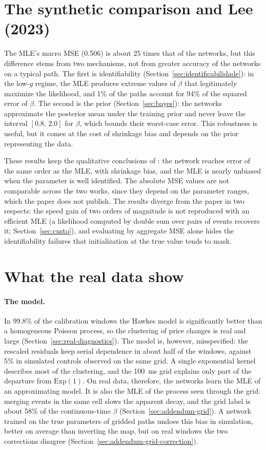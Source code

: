 \section{The synthetic comparison and Lee (2023)}

The MLE's macro MSE (0.506) is about 25 times that of the networks, but this
difference stems from two mechanisms, not from greater accuracy of the networks on a
typical path. The first is identifiability (Section~\ref{sec:identificabilidade}): in
the low-\(g\) regime, the MLE produces extreme values of \(\beta\) that legitimately
maximize the likelihood, and 1\% of the paths account for 94\% of the squared error
of \(\beta\). The second is the prior (Section~\ref{sec:bayes}): the networks
approximate the posterior mean under the training prior and never leave the interval
\([0.8,\,2.0]\) for \(\beta\), which bounds their worst-case error. This robustness is
useful, but it comes at the cost of shrinkage bias and depends on the prior
representing the data.

These results keep the qualitative conclusions of \citet{lee2023}: the network reaches error of the same order as
the MLE, with shrinkage bias, and the MLE is nearly unbiased when the parameter is
well identified. The absolute MSE values are not comparable across the two works,
since they depend on the parameter ranges, which the paper does not publish. The
results diverge from the paper in two respects: the speed gain of two orders of magnitude is not
reproduced with an efficient MLE (a likelihood computed by double sum over pairs of events
recovers it; Section~\ref{sec:custo}), and evaluating by aggregate MSE alone hides the
identifiability failures that initialization at the true value tends to mask.

\section{What the real data show}

\paragraph{The model.} In 99.8\% of the calibration windows the Hawkes model is significantly better than a
homogeneous Poisson process, so the clustering of price changes is real and large
(Section~\ref{sec:real-diagnostics}). The model is, however, misspecified: the rescaled
residuals keep serial dependence in about half of the windows, against 5\% in simulated
controls observed on the same grid. A single exponential kernel describes most of the
clustering, and the 100~ms grid explains only part of the
departure from \(\mathrm{Exp}(1)\). On real data, therefore, the networks learn
the MLE of an approximating model. It is also the MLE of the process seen through
the grid: merging events in the same cell slows the apparent decay, and the grid label is
about 58\% of the continuous-time $\beta$ (Section~\ref{sec:addendum-grid}). A network trained on
the true parameters of gridded paths undoes this bias in simulation, better on average than
inverting the map, but on real windows the two corrections disagree
(Section~\ref{sec:addendum-grid-correction}).

